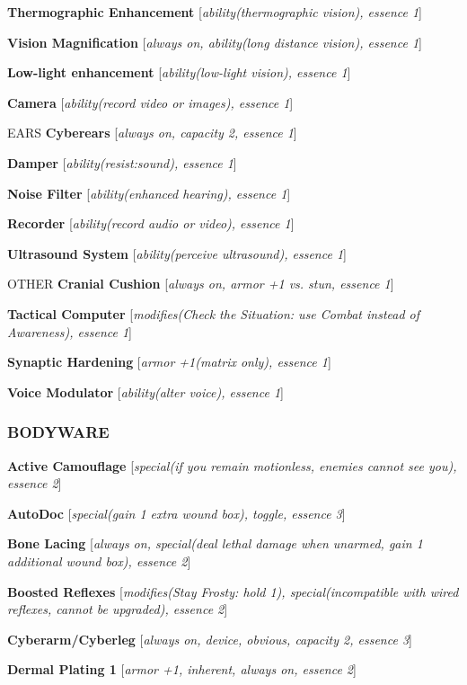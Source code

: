 \documentclass[oneside,10pt]{article}
\begin{document}
\begin{multicols}{2}
\textbf{Thermographic Enhancement} [\textit{ability(thermographic vision), essence 1}]

\textbf{Vision Magnification} [\textit{always on, ability(long distance vision), essence 1}]

\textbf{Low-light enhancement} [\textit{ability(low-light vision), essence
1}]

\textbf{Camera} [\textit{ability(record video or
  images), essence 1}]

EARS
\textbf{Cyberears} [\textit{always on, capacity 2, essence 1}]

\textbf{Damper} [\textit{ability(resist:sound),
  essence 1}]

\textbf{Noise Filter} [\textit{ability(enhanced
  hearing), essence 1}]

\textbf{Recorder} [\textit{ability(record audio or
  video), essence 1}]

\textbf{Ultrasound System}
[\textit{ability(perceive ultrasound), essence 1}]

OTHER
\textbf{Cranial Cushion} [\textit{always on, armor
  +1 vs. stun, essence 1}]

\textbf{Tactical Computer} [\textit{modifies(Check the Situation: use Combat instead of Awareness), essence 1}]

\textbf{Synaptic Hardening} [\textit{armor
  +1(matrix only), essence 1}]

\textbf{Voice Modulator} [\textit{ability(alter
  voice), essence 1}]


\subsubsection{BODYWARE}
\textbf{Active Camouflage} [\textit{special(if you remain motionless, enemies cannot see you), essence 2}]

\textbf{AutoDoc} [\textit{special(gain 1 extra wound box), toggle, essence
3}]

\textbf{Bone Lacing} [\textit{always on, special(deal lethal damage when
unarmed, gain 1 additional wound box), essence 2}]

\textbf{Boosted Reflexes} [\textit{modifies(Stay Frosty: hold 1), special(incompatible with wired reflexes, cannot be upgraded), essence 2}]

\textbf{Cyberarm/Cyberleg} [\textit{always on, device, obvious, capacity
2, essence 3}]

\textbf{Dermal Plating 1} [\textit{armor +1,
  inherent, always on, essence 2}]


\end{multicols}
\end{document}
